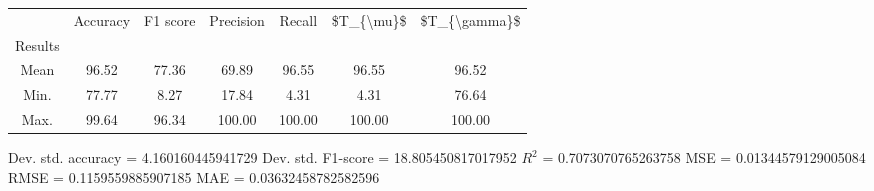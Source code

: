 \begin{tabular}{|c|c|c|c|c|c|c|}
\toprule
{} &  Accuracy &  F1 score &  Precision &  Recall &  \$T\_\{\textbackslash mu\}\$ &  \$T\_\{\textbackslash gamma\}\$ \\
Results &           &           &            &         &            &               \\
\hline
Mean    &     96.52 &     77.36 &      69.89 &   96.55 &      96.55 &         96.52 \\
Min.    &     77.77 &      8.27 &      17.84 &    4.31 &       4.31 &         76.64 \\
Max.    &     99.64 &     96.34 &     100.00 &  100.00 &     100.00 &        100.00 \\
\bottomrule
\end{tabular}

 Dev. std. accuracy = 4.160160445941729
 Dev. std. F1-score = 18.805450817017952
 $R^2$ = 0.7073070765263758
 MSE = 0.01344579129005084
 RMSE = 0.1159559885907185
 MAE = 0.03632458782582596